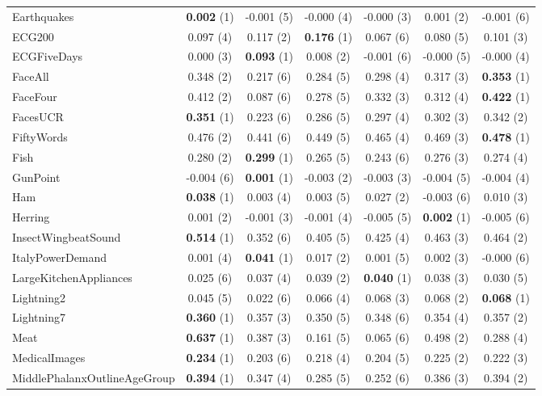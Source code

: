 \begin{table}[ht]
\begin{adjustbox}{width=\textwidth}
\begin{tabular}{lcccccc}
    Earthquakes & \textbf{0.002} (1) & -0.001 (5) & -0.000 (4) & -0.000 (3) & 0.001 (2) & -0.001 (6) \\
    ECG200 & 0.097 (4) & 0.117 (2) & \textbf{0.176} (1) & 0.067 (6) & 0.080 (5) & 0.101 (3) \\
    ECGFiveDays & 0.000 (3) & \textbf{0.093} (1) & 0.008 (2) & -0.001 (6) & -0.000 (5) & -0.000 (4) \\
    FaceAll & 0.348 (2) & 0.217 (6) & 0.284 (5) & 0.298 (4) & 0.317 (3) & \textbf{0.353} (1) \\
    FaceFour & 0.412 (2) & 0.087 (6) & 0.278 (5) & 0.332 (3) & 0.312 (4) & \textbf{0.422} (1) \\
    FacesUCR & \textbf{0.351} (1) & 0.223 (6) & 0.286 (5) & 0.297 (4) & 0.302 (3) & 0.342 (2) \\
    FiftyWords & 0.476 (2) & 0.441 (6) & 0.449 (5) & 0.465 (4) & 0.469 (3) & \textbf{0.478} (1) \\
    Fish & 0.280 (2) & \textbf{0.299} (1) & 0.265 (5) & 0.243 (6) & 0.276 (3) & 0.274 (4) \\
    GunPoint & -0.004 (6) & \textbf{0.001} (1) & -0.003 (2) & -0.003 (3) & -0.004 (5) & -0.004 (4) \\
    Ham & \textbf{0.038} (1) & 0.003 (4) & 0.003 (5) & 0.027 (2) & -0.003 (6) & 0.010 (3) \\
    Herring & 0.001 (2) & -0.001 (3) & -0.001 (4) & -0.005 (5) & \textbf{0.002} (1) & -0.005 (6) \\
    InsectWingbeatSound & \textbf{0.514} (1) & 0.352 (6) & 0.405 (5) & 0.425 (4) & 0.463 (3) & 0.464 (2) \\
    ItalyPowerDemand & 0.001 (4) & \textbf{0.041} (1) & 0.017 (2) & 0.001 (5) & 0.002 (3) & -0.000 (6) \\
    LargeKitchenAppliances & 0.025 (6) & 0.037 (4) & 0.039 (2) & \textbf{0.040} (1) & 0.038 (3) & 0.030 (5) \\
    Lightning2 & 0.045 (5) & 0.022 (6) & 0.066 (4) & 0.068 (3) & 0.068 (2) & \textbf{0.068} (1) \\
    Lightning7 & \textbf{0.360} (1) & 0.357 (3) & 0.350 (5) & 0.348 (6) & 0.354 (4) & 0.357 (2) \\
    Meat & \textbf{0.637} (1) & 0.387 (3) & 0.161 (5) & 0.065 (6) & 0.498 (2) & 0.288 (4) \\
    MedicalImages & \textbf{0.234} (1) & 0.203 (6) & 0.218 (4) & 0.204 (5) & 0.225 (2) & 0.222 (3) \\
    MiddlePhalanxOutlineAgeGroup & \textbf{0.394} (1) & 0.347 (4) & 0.285 (5) & 0.252 (6) & 0.386 (3) & 0.394 (2) \\

\end{tabular}
\end{adjustbox}
\end{table}

